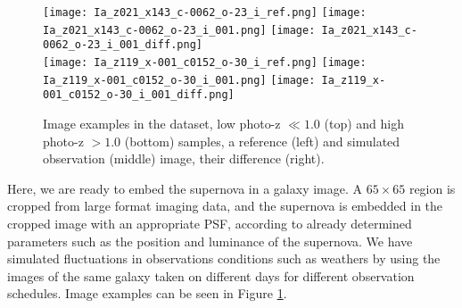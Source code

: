 \documentclass[conference,compsoc]{IEEEtran}
\begin{document}
\begin{figure}[t]
  \begin{center}
    \texttt{[image: Ia\_z021\_x143\_c-0062\_o-23\_i\_ref.png]}\hspace{10pt}
    \texttt{[image: Ia\_z021\_x143\_c-0062\_o-23\_i\_001.png]}\hspace{10pt}
    \texttt{[image: Ia\_z021\_x143\_c-0062\_o-23\_i\_001\_diff.png]}\\
    \vspace{5pt}
    \texttt{[image: Ia\_z119\_x-001\_c0152\_o-30\_i\_ref.png]}\hspace{10pt}
    \texttt{[image: Ia\_z119\_x-001\_c0152\_o-30\_i\_001.png]}\hspace{10pt}
    \texttt{[image: Ia\_z119\_x-001\_c0152\_o-30\_i\_001\_diff.png]}
  \end{center}
  \caption{%
    Image examples in the dataset, low photo-z $\ll 1.0$ (top) and high photo-z $>1.0$ (bottom) samples,
    a reference (left) and simulated observation (middle) image,  their difference (right).
  }
  \label{fig:data_examples}
\end{figure}

  Here, we are ready to embed the supernova in a galaxy image.
  A $65\times 65$ region is cropped from large format imaging data, and the supernova is embedded in the cropped image with an appropriate PSF, according to already determined parameters such as the position and luminance of the supernova.
  We have simulated fluctuations in observations conditions such as weathers by using the images of the same galaxy taken on different days for different observation schedules.
  Image examples can be seen in Figure \ref{fig:data_examples}.
\end{document}
